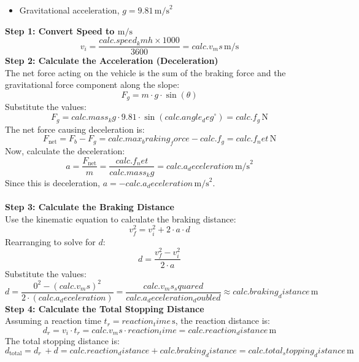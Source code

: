 \documentclass[14pt]{article}
\begin{document}
{{{{{\begin{itemize}
    $$F_{b}/\text{wheel} = \frac{ {{ calc.max_braking_force }} }{ {{ number_of_wheels }} } = {{ min_braking_force }} \, \text{N}$$
    \item Gravitational acceleration, \( g = 9.81 \, \text{m/s}^2 \)
\end{itemize}
    \textbf{Step 1: Convert Speed to \( \text{m/s} \)}
    \[
    v_i = \frac{ {{ calc.speed_kmh }} \times 1000 }{ 3600 } = {{ calc.v_ms }} \, \text{m/s}
    \]
\textbf{Step 2: Calculate the Acceleration (Deceleration)}\\
The net force acting on the vehicle is the sum of the braking force and the gravitational force component along the slope:
\[
F_g = m \cdot g \cdot \sin(\theta)
\]  
Substitute the values:
\[
F_g = {{ calc.mass_kg }} \cdot 9.81 \cdot \sin({{ calc.angle_deg }}^\circ) = {{ calc.f_g }} \, \text{N}
\]
The net force causing deceleration is:
\[
F_{\text{net}} = F_b - F_g = {{ calc.max_braking_force }} - {{ calc.f_g }} = {{ calc.f_net }} \, \text{N}
\]
Now, calculate the deceleration:
\[
a = \frac{F_{\text{net}} }{m} = \frac{ {{ calc.f_net }} }{ {{ calc.mass_kg }} } = {{ calc.a_deceleration }} \, \text{m/s}^2
\]
Since this is deceleration, \( a = -{{ calc.a_deceleration }} \, \text{m/s}^2 \).\\
\\
\textbf{Step 3: Calculate the Braking Distance}\\
Use the kinematic equation to calculate the braking distance:\\
\[
v_f^2 = v_i^2 + 2 \cdot a \cdot d
\]
Rearranging to solve for \( d \):\\
\[
d = \frac{v_f^2 - v_i^2}{2 \cdot a}
\]
Substitute the values:\\
\[
d = \frac{0^2 - ({{ calc.v_ms }})^2}{2 \cdot ({{ calc.a_deceleration }})} = \frac{ {{ calc.v_ms_squared }} }{ {{ calc.a_deceleration_doubled }} } \approx {{ calc.braking_distance }} \, \text{m}
\]
\textbf{Step 4: Calculate the Total Stopping Distance}\\
Assuming a reaction time \( t_r = {{ reaction_time }} \, \text{s} \), the reaction distance is:\\
\[
d_r = v_i \cdot t_r = {{ calc.v_ms }} \cdot {{ reaction_time }} = {{ calc.reaction_distance }} \, \text{m}
\]
The total stopping distance is:
\[
d_{\text{total}} = d_r\ + d = {{ calc.reaction_distance }} + {{ calc.braking_distance }} = {{ calc.total_stopping_distance }} \, \text{m}
\]
{%
{%

{%
{%
}}}}}}}}}
\end{document}
